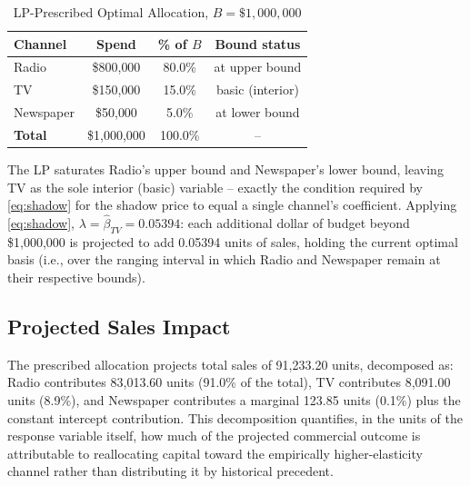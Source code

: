 \documentclass[conference]{IEEEtran}
\begin{document}
\begin{table}[t]
\caption{LP-Prescribed Optimal Allocation, $B=\$1{,}000{,}000$}
\label{tab:allocation}
\centering
\begin{tabular}{lccc}
\toprule
\textbf{Channel} & \textbf{Spend} & \textbf{\% of $B$} & \textbf{Bound status} \\
\midrule
Radio & \$800{,}000 & 80.0\% & at upper bound \\
TV & \$150{,}000 & 15.0\% & basic (interior) \\
Newspaper & \$50{,}000 & 5.0\% & at lower bound \\
\midrule
\textbf{Total} & \$1{,}000{,}000 & 100.0\% & -- \\
\bottomrule
\end{tabular}
\end{table}

The LP saturates Radio's upper bound and Newspaper's lower bound, leaving TV as the sole interior (basic) variable -- exactly the condition required by \eqref{eq:shadow} for the shadow price to equal a single channel's coefficient. Applying \eqref{eq:shadow}, $\lambda = \hat\beta_{TV} = 0.05394$: each additional dollar of budget beyond \$1{,}000{,}000 is projected to add 0.05394 units of sales, holding the current optimal basis (i.e., over the ranging interval in which Radio and Newspaper remain at their respective bounds).

\subsection{Projected Sales Impact}
The prescribed allocation projects total sales of 91{,}233.20 units, decomposed as: Radio contributes 83{,}013.60 units (91.0\% of the total), TV contributes 8{,}091.00 units (8.9\%), and Newspaper contributes a marginal 123.85 units (0.1\%) plus the constant intercept contribution. This decomposition quantifies, in the units of the response variable itself, how much of the projected commercial outcome is attributable to reallocating capital toward the empirically higher-elasticity channel rather than distributing it by historical precedent.
\end{document}

